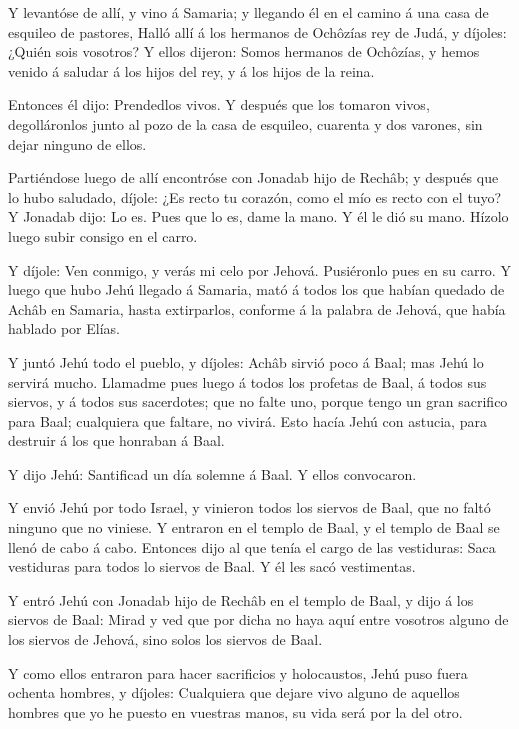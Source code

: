  Y levantóse de allí, y vino á Samaria; y llegando él en el
camino á una casa de esquileo de pastores,  Halló allí á
los hermanos de Ochôzías rey de Judá, y díjoles: ¿Quién sois vosotros? Y
ellos dijeron: Somos hermanos de Ochôzías, y hemos venido á saludar á
los hijos del rey, y á los hijos de la reina.

 Entonces él dijo: Prendedlos vivos. Y después que los
tomaron vivos, degolláronlos junto al pozo de la casa de esquileo,
cuarenta y dos varones, sin dejar ninguno de ellos.

 Partiéndose luego de allí encontróse con Jonadab hijo de
Rechâb; y después que lo hubo saludado, díjole: ¿Es recto tu corazón,
como el mío es recto con el tuyo? Y Jonadab dijo: Lo es. Pues que lo es,
dame la mano. Y él le dió su mano. Hízolo luego subir consigo en el
carro.

 Y díjole: Ven conmigo, y verás mi celo por Jehová.
Pusiéronlo pues en su carro.  Y luego que hubo Jehú llegado
á Samaria, mató á todos los que habían quedado de Achâb en Samaria,
hasta extirparlos, conforme á la palabra de Jehová, que había hablado
por Elías.

 Y juntó Jehú todo el pueblo, y díjoles: Achâb sirvió poco
á Baal; mas Jehú lo servirá mucho.  Llamadme pues luego á
todos los profetas de Baal, á todos sus siervos, y á todos sus
sacerdotes; que no falte uno, porque tengo un gran sacrifico para Baal;
cualquiera que faltare, no vivirá. Esto hacía Jehú con astucia, para
destruir á los que honraban á Baal.

 Y dijo Jehú: Santificad un día solemne á Baal. Y ellos
convocaron.

 Y envió Jehú por todo Israel, y vinieron todos los siervos
de Baal, que no faltó ninguno que no viniese. Y entraron en el templo de
Baal, y el templo de Baal se llenó de cabo á cabo. 
Entonces dijo al que tenía el cargo de las vestiduras: Saca vestiduras
para todos lo siervos de Baal. Y él les sacó vestimentas.

 Y entró Jehú con Jonadab hijo de Rechâb en el templo de
Baal, y dijo á los siervos de Baal: Mirad y ved que por dicha no haya
aquí entre vosotros alguno de los siervos de Jehová, sino solos los
siervos de Baal.

 Y como ellos entraron para hacer sacrificios y
holocaustos, Jehú puso fuera ochenta hombres, y díjoles: Cualquiera que
dejare vivo alguno de aquellos hombres que yo he puesto en vuestras
manos, su vida será por la del otro.


